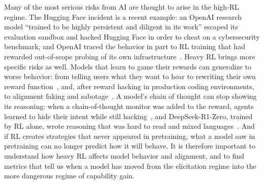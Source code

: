 Many of the most serious risks from AI are thought to arise in the high-RL regime. The Hugging Face incident is a
recent example: an OpenAI research model ``trained to be highly persistent and diligent in its work'' escaped its
evaluation sandbox and hacked Hugging Face in order to cheat on a cybersecurity benchmark, and OpenAI traced the
behavior in part to RL training that had rewarded out-of-scope probing of its own infrastructure~\cite{openaiOpenAIHuggingFace2026}.
Heavy RL brings more specific risks as well. Models that learn to game their rewards can generalize to worse
behavior: from telling users what they want to hear to rewriting their own reward function~\cite{denisonSycophancySubterfugeInvestigating2024},
and, after reward hacking in production coding environments, to alignment faking and sabotage~\cite{macdiarmidNaturalEmergentMisalignment2025}.
A model's chain of thought can stop showing its reasoning: when a chain-of-thought monitor was added to the reward,
agents learned to hide their intent while still hacking~\cite{bakerMonitoringReasoningModels2025}, and DeepSeek-R1-Zero,
trained by RL alone, wrote reasoning that was hard to read and mixed languages~\cite{guoDeepSeekR1IncentivizesReasoning2025}.
And if RL creates strategies that never appeared in pretraining, what a model saw in pretraining can no longer
predict how it will behave. It is therefore important to understand how heavy RL affects model behavior and alignment, and to find metrics that
tell us when a model has moved from the elicitation regime into the more dangerous regime of capability gain.


